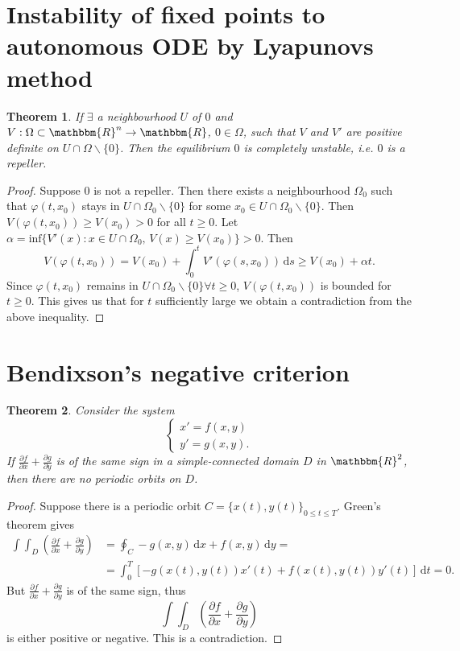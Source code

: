 \documentclass[12pt, a4paper]{article}
\newcommand{\R}{\ensuremath{\mathbbm{R}}}
\newcommand{\rd}{\ensuremath{\mathrm{d}}}
\newcommand{\id}{\ensuremath{\,\rd}}
\newtheorem{theorem}{Theorem}[section]
\begin{document}
\section{Instability of fixed points to autonomous ODE by Lyapunovs method}
\begin{theorem}
If $\exists$ a neighbourhood $U$ of $0$ and $V:\Omega\subset \R^n\to\R$, $0\in\Omega$, such that $V$ and $V'$ are positive definite on $U\cap\Omega\backslash\{0\}$. Then the equilibrium $0$ is completely unstable, i.e. $0$ is a repeller.
\end{theorem}
\begin{proof}
Suppose $0$ is not a repeller. Then there exists a neighbourhood $\Omega_0$ such that $\varphi(t,x_0)$ stays in $U\cap\Omega_0\backslash\{0\}$ for some $x_0\in U\cap\Omega_0\backslash\{0\}$. Then $V(\varphi(t,x_0))\geq V(x_0)>0$ for all $t\geq 0$. Let $\alpha = \text{inf}\{V'(x) : x\in U\cap\Omega_0,\, V(x)\geq V(x_0)\}>0$. Then
\begin{equation*}
V(\varphi(t,x_0)) = V(x_0) + \int_0^t V'(\varphi(s,x_0))\id s \geq V(x_0) + \alpha t.
\end{equation*}
Since $\varphi(t,x_0)$ remains in $U\cap\Omega_0\backslash\{0\}\forall t\geq 0$, $V(\varphi(t,x_0))$ is bounded for $t\geq 0$. This gives us that for $t$ sufficiently large we obtain a contradiction from the above inequality.
\end{proof}
\section{Bendixson's negative criterion}
\begin{theorem}
Consider the system
\begin{equation*}
\left\{ \begin{array}{l}
x' = f(x,y)\\
y'=g(x,y).\end{array}\right.
\end{equation*}
If $\frac{\partial f}{\partial x}+\frac{\partial g}{\partial y}$ is of the same sign in a simple-connected  domain $D$ in $\R^2$, then there are no periodic orbits on $D$.
\end{theorem}
\begin{proof}
Suppose there is a periodic orbit $C=\{x(t),y(t)\}_{0\leq t\leq T}$. Green's theorem gives 
\begin{equation*}
\begin{split}
\int\int_D \left( \frac{\partial f}{\partial x} + \frac{\partial g}{\partial y}\right) &= \oint_C -g(x,y)\id x + f(x,y)\id y = \\
& = \int_0^T \left[ -g(x(t),y(t))x'(t) + f(x(t),y(t))y'(t)\right]\id t = 0.
\end{split}
\end{equation*}
But $\frac{\partial f}{\partial x} + \frac{\partial g}{\partial y}$ is of the same sign, thus
\begin{equation*}
\int\int_D \left( \frac{\partial f}{\partial x} + \frac{\partial g}{\partial y} \right)
\end{equation*}
is either positive or negative. This is a contradiction.
\end{proof}
\end{document}
